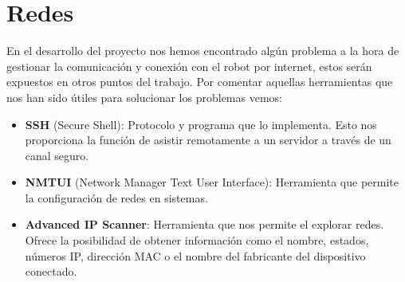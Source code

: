 \section{Redes}
En el desarrollo del proyecto nos hemos encontrado algún problema a la hora de gestionar la comunicación y conexión con el robot por internet, estos serán expuestos en otros puntos del trabajo. Por comentar aquellas herramientas que nos han sido útiles para solucionar los problemas vemos:
\begin{itemize}
    \item \textbf{SSH} (Secure Shell): Protocolo y programa que lo implementa. Esto nos proporciona la función de asistir remotamente a un servidor a través de un canal seguro.
    \item \textbf{NMTUI} (Network Manager Text User Interface): Herramienta que permite la configuración de redes en sistemas.
    \item\textbf{Advanced IP Scanner}: Herramienta que nos permite el explorar redes. Ofrece la posibilidad de obtener información como el nombre, estados, números IP, dirección MAC o el nombre del fabricante del dispositivo conectado.
\end{itemize}



